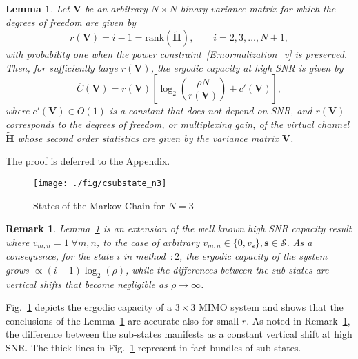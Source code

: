 \documentclass[10pt,conference]{IEEEtran}
\newtheorem{lemma}[theorem]{Lemma}
\newtheorem{remark}{Remark}
\newcommand{\rankH}{r}
\begin{document}
\begin{lemma}
\label{lemma:cap_approx_highsnr_2}
Let $\mathbf{V}$ be an arbitrary $N \times N$ binary variance matrix for which the degrees of freedom are given by
\begin{equation}
	\rankH(\mathbf{V}) = i - 1 = \mathrm{rank}(\widetilde{\mathbf{H}}), \qquad i = 2,3,\ldots,N+1 ,
\end{equation}
with probability one  when the power constraint~\eqref{E:normalization_v} is preserved.
Then, for sufficiently large $\rankH(\mathbf{V})$, the ergodic capacity at high SNR is given by
\begin{equation}\label{E:HighDOF_HighCap}
\overline{C}(\mathbf{V}) = \rankH(\mathbf{V}) \left[\log_{2} \left(\frac{\rho N}{\rankH(\mathbf{V})}\right) + c'(\mathbf{V})\right],
\end{equation}
where $c'(\mathbf{V})\in O(1)$ is a constant that does not depend on SNR, and
$\rankH(\mathbf{V})$ corresponds to the degrees of freedom, or multiplexing gain, of the virtual channel $\widetilde{\mathbf{H}}$ whose second order statistics are given by the variance matrix $\mathbf{V}$.
\end{lemma}
\begin{IEEEproof}
The proof is deferred to the Appendix.
\end{IEEEproof}
\begin{figure}[t]
\centering
\texttt{[image: ./fig/csubstate\_n3]}
\caption{States of the Markov Chain for $N = 3$}
\label{F:cap_substates}
\end{figure}
\begin{remark}
	\label{remark:cap_approx_highsnr}
	Lemma~\ref{lemma:cap_approx_highsnr_2} is an extension of the well known high SNR capacity result \cite{MIMO:Foschini:98:limits} where $v_{m,n}=1 \; \forall m,n$, to the case of arbitrary $v_{m,n}\in\{0,v_{\mathbf{s}}\}, \mathbf{s}\in\mathcal{S}$.  As a consequence, for the state $i$ in \emph{method~$:2$}, the ergodic capacity of the system grows  $\propto (i-1) \log_{2} (\rho)$, while the differences between the sub-states are  vertical shifts that become negligible as $\rho\to\infty$.
\end{remark}


Fig.~\ref{F:cap_substates} depicts the ergodic capacity of a $3\times3$ MIMO system and shows that the conclusions of the Lemma~\ref{lemma:cap_approx_highsnr_2} are accurate also for small $r$. As noted in Remark~\ref{remark:cap_approx_highsnr}, the difference between the sub-states manifests as a constant vertical shift at high SNR.
The thick lines in Fig.~\ref{F:cap_substates} represent in fact bundles of sub-states.
\end{document}
